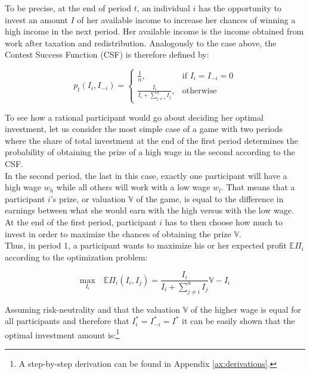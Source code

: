 To be precise, at the end of period $t$, an individual $i$ has the opportunity to invest an amount $I$ of her available income to increase her chances of winning a high income in the next period. Her available income is the income obtained from work after taxation and redistribution. Analogously to the case above, the Contest Success Function (CSF) is therefore defined by:

\begin{equation}
    p_t(I_i,I_{-i}) =
\begin{cases}
    \frac{1}{n},& \text{if } I_i = I_{-i} = 0\\
    \frac{I_i}{I_i + \sum_{j\neq i}^n I_{j}},              & \text{otherwise}
\end{cases}
\label{eq:csf}    
\end{equation}

\hfill \break

To see how a rational participant would go about deciding her optimal investment, let us consider the most simple case of a game with two periods where the share of total investment at the end of the first period determines the probability of obtaining the prize of a high wage in the second according to the CSF.\\

In the second period, the last in this case, exactly one participant will have a high wage $w_h$ while all others will work with a low wage $w_l$. That means that a participant $i$'s prize, or valuation $\mathbb{V}$ of the game, is equal to the difference in earnings between what she would earn with the high versus with the low wage. At the end of the first period, participant $i$ has to then choose how much to invest in order to maximize the chances of obtaining the prize $\mathbb{V}$.\\

Thus, in period 1, a participant wants to maximize his or her expected profit $\mathbb{E}\Pi_i$ according to the optimization problem:

\begin{equation}
    \underset{I_i}{\text{max}}\quad\mathbb{E}\Pi_i(I_i,I_j) = \frac{I_i}{I_i + \sum_{j\neq i}^n I_{j}}\mathbb{V} - I_i
\label{eq:exp_util}
\end{equation}

Assuming risk-neutrality and that the valuation $\mathbb{V}$ of the higher wage is equal for all participants and therefore that $I_i^{*}=I_{-i}^{*}=I^{*}$ it can be easily shown that the optimal investment amount is:\footnote{A step-by-step derivation can be found in Appendix \ref{ax:derivations}.}

